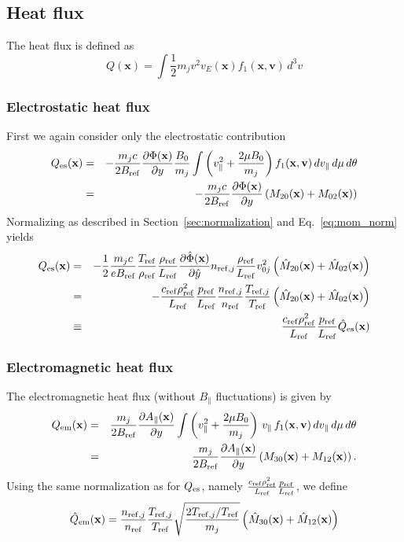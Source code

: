 \subsection{Heat flux}
\label{sec:heatflux}
The heat flux is defined as
\begin{equation}
Q(\mathbf{x}) = \int \frac{1}{2}m_jv^2 v_E(\mathbf{x})f_1(\mathbf{x},\mathbf{v})\,d^3v
\label{eq:Q_basic}
\end{equation}

\subsubsection{Electrostatic heat flux}
First we again consider only the electrostatic contribution
\begin{eqnarray*}
Q_\mathrm{es}(\mathbf{x})&=&-\frac{m_jc}{2B_{\mathrm{ref}}} \frac{\partial\Phi(\mathbf{x})}{\partial y} 
 \frac{B_0}{m_j} \int \left(v_\|^2+\frac{2\mu B_0}{m_j}\right) 
 f_1(\mathbf{x},\mathbf{v})\,dv_\| \,d\mu \,d\theta\\
&=& -\frac{m_jc}{2B_{\mathrm{ref}}} \frac{\partial\Phi(\mathbf{x})}{\partial y} 
 \left(M_{20}(\mathbf{x})+M_{02}(\mathbf{x})\right)
\end{eqnarray*}
Normalizing as described in Section~\ref{sec:normalization} and Eq.~\ref{eq:mom_norm} 
yields
\begin{eqnarray}
Q_\mathrm{es}(\mathbf{x})
&=& -\frac{1}{2}\frac{m_j c}{e B_{\mathrm{ref}}}\frac{T_{\mathrm{ref}}}{\rho_{\mathrm{ref}}}\frac{\rho_{\mathrm{ref}}}{L_{\mathrm{ref}}}
 \frac{\partial\hat{\Phi}(\mathbf{x})}{\partial \hat{y}}
 n_{\mathrm{ref},j} \frac{\rho_{\mathrm{ref}}}{L_{\mathrm{ref}}} v_{0j}^2 \left(\hat{M}_{20}(\mathbf{x})+
 \hat{M}_{02}(\mathbf{x})\right)\nonumber \\
&=& - \frac{c_{\mathrm{ref}} \rho_{\mathrm{ref}}^2}{L_{\mathrm{ref}}}\frac{p_{\mathrm{ref}}}{L_{\mathrm{ref}}} 
 \frac{n_{\mathrm{ref},j}}{n_{\mathrm{ref}}}\frac{T_{\mathrm{ref},j}}{T_{\mathrm{ref}}}\left(\hat{M}_{20}(\mathbf{x})+
 \hat{M}_{02}(\mathbf{x})\right)\nonumber \\
&\equiv & \frac{c_{\mathrm{ref}} \rho_{\mathrm{ref}}^2}{L_{\mathrm{ref}}}\frac{p_{\mathrm{ref}}}{L_{\mathrm{ref}}} \hat{Q}_\mathrm{es}(\mathbf{x})
\label{eq:Qes_norm}
\end{eqnarray}

\subsubsection{Electromagnetic heat flux}
The electromagnetic heat flux (without $B_\|$ fluctuations) is given by
\begin{eqnarray*}
Q_\mathrm{em}(\mathbf{x})&=&\frac{m_j}{2B_{\mathrm{ref}}}\frac{\partial A_\| (\mathbf{x})}{\partial y} 
 \int \left(v_\|^2+\frac{2\mu B_0}{m_j}\right)\, v_\| \,
 f_1(\mathbf{x},\mathbf{v})\,dv_\| \,d\mu \,d\theta\\
&=& \frac{m_j}{2B_{\mathrm{ref}}}\frac{\partial A_\| (\mathbf{x})}{\partial y}
 \left( M_{30}(\mathbf{x}) + M_{12}(\mathbf{x})\right).
\end{eqnarray*}
Using the same normalization as for $Q_{\rm es}$, 
namely $\frac{c_{\mathrm{ref}} \rho_{\mathrm{ref}}^2}{L_{\mathrm{ref}}}\frac{p_{\mathrm{ref}}}{L_{\mathrm{ref}}}$, we define
\begin{equation}
\hat{Q}_\mathrm{em}(\mathbf{x}) = \frac{n_{\mathrm{ref},j}}{n_{\mathrm{ref}}}\frac{T_{\mathrm{ref},j}}{T_{\mathrm{ref}}}
  \sqrt{\frac{2T_{\mathrm{ref},j}/T_{\mathrm{ref}}}{m_j}}
  \left( \hat{M}_{30}(\mathbf{x}) + \hat{M}_{12}(\mathbf{x})\right)
\end{equation}


